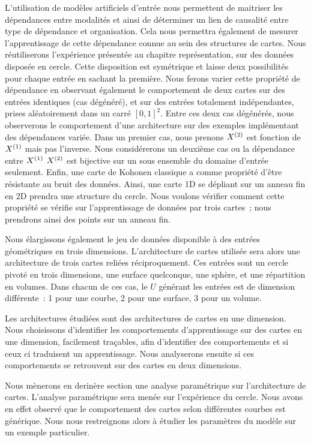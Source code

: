\documentclass[../main]{subfiles}
\begin{document}
L'utilisation de modèles artificiels d'entrée nous permettent de maitriser les dépendances entre modalités et ainsi de déterminer un lien de causalité entre type de dépendance et organisation. Cela nous permettra également de mesurer l'apprentissage de cette dépendance connue au sein des structures de cartes.
Nous réutiliserons l'expérience présentée au chapitre représentation, sur des données disposée en cercle. Cette disposition est symétrique et laisse deux possibilités pour chaque entrée en sachant la première.
Nous ferons varier cette propriété de dépendance en observant également le comportement de deux cartes sur des entrées identiques (cas dégénéré), et sur des entrées totalement indépendantes, prises aléatoirement dans un carré $[0,1]^2$.
Entre ces deux cas dégénérés, nous observerons le comportement d'une architecture sur des exemples implémentant des dépendances variée. Dans un premier cas, nous prenons $X^{({2})}$ est fonction de $X^{({1})}$ mais pas l'inverse.
Nous considérerons un deuxième cas ou la dépendance entre $X^{({1})}$ $X^{({2})}$ est bijective sur un sous ensemble du domaine d'entrée seulement.
Enfin, une carte de Kohonen classique a comme propriété d'être résistante au bruit des données. Ainsi, une carte 1D se dépliant sur un anneau fin en 2D prendra une structure du cercle. Nous voulons vérifier comment cette propriété se vérifie sur l'apprentissage de données par trois cartes~; nous prendrons ainsi des points sur un anneau fin.

Nous élargissons également le jeu de données disponible à des entrées géométriques en trois dimensions. L'architecture de cartes utilisée sera alors une architecture de trois cartes reliées réciproquement.
Ces entrées sont un cercle pivoté en trois dimensions, une surface quelconque, une sphère, et une répartition en volumes. Dans chacun de ces cas, le $U$ générant les entrées est de dimension différente~: 1 pour une courbe,  2 pour une surface, 3 pour un volume.

Les architectures étudiées sont des architectures de cartes en une dimension. Nous choisissons d'identifier les comportements d'apprentissage sur des cartes en une dimension, facilement traçables, afin d'identifier des comportements et si ceux ci traduisent un apprentissage. Nous analyserons ensuite si ces comportements se retrouvent sur des cartes en deux dimensions.

Nous mènerons en derinère section une analyse paramétrique sur l'architecture de cartes. 
L'analyse paramétrique sera menée sur l'expérience du cercle. Nous avons en effet observé que le comportement des cartes selon différentes courbes est générique. Nous nous restreignons alors à étudier les paramètres du modèle sur un exemple particulier.
\end{document}
